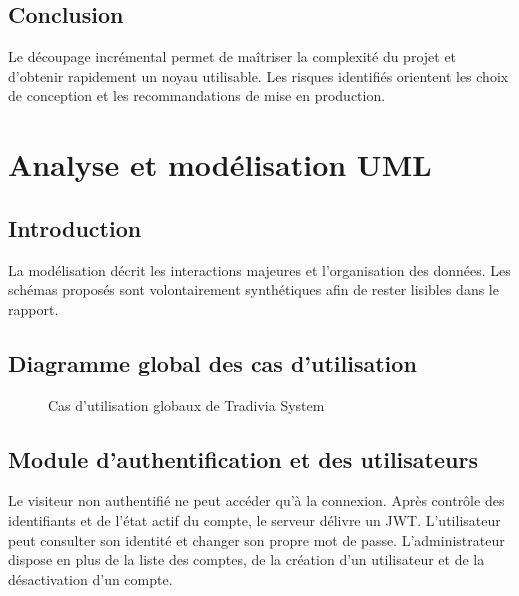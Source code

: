 \documentclass[12pt,a4paper,oneside]{report}
\begin{document}
\section*{Conclusion}
Le découpage incrémental permet de maîtriser la complexité du projet et d'obtenir rapidement un noyau utilisable. Les risques identifiés orientent les choix de conception et les recommandations de mise en production.

\chapter{Analyse et modélisation UML}
\section*{Introduction}
La modélisation décrit les interactions majeures et l'organisation des données. Les schémas proposés sont volontairement synthétiques afin de rester lisibles dans le rapport.

\section{Diagramme global des cas d'utilisation}
\begin{figure}[H]\centering
{}
\caption{Cas d'utilisation globaux de Tradivia System}
\end{figure}

\section{Module d'authentification et des utilisateurs}
Le visiteur non authentifié ne peut accéder qu'à la connexion. Après contrôle des identifiants et de l'état actif du compte, le serveur délivre un JWT. L'utilisateur peut consulter son identité et changer son propre mot de passe. L'administrateur dispose en plus de la liste des comptes, de la création d'un utilisateur et de la désactivation d'un compte.
\end{document}
